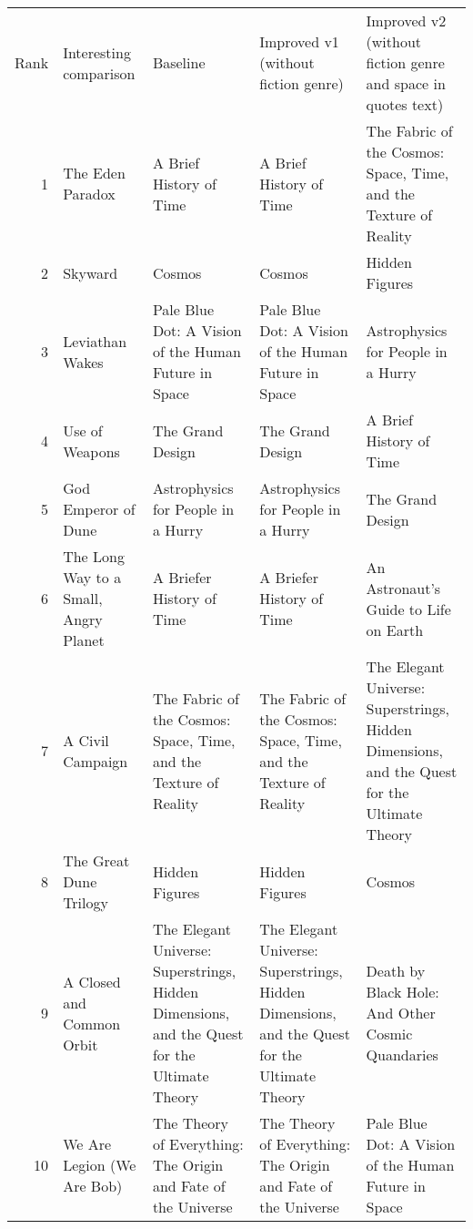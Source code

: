 \begin{tabular}{rllll}
Rank & Interesting comparison & Baseline & Improved v1 (without fiction genre) & Improved v2 (without fiction genre and space in quotes text) \\
1 & The Eden Paradox & A Brief History of Time & A Brief History of Time & The Fabric of the Cosmos: Space, Time, and the Texture of Reality \\
2 & Skyward & Cosmos & Cosmos & Hidden Figures \\
3 & Leviathan Wakes & Pale Blue Dot: A Vision of the Human Future in Space & Pale Blue Dot: A Vision of the Human Future in Space & Astrophysics for People in a Hurry \\
4 & Use of Weapons & The Grand Design & The Grand Design & A Brief History of Time \\
5 & God Emperor of Dune & Astrophysics for People in a Hurry & Astrophysics for People in a Hurry & The Grand Design \\
6 & The Long Way to a Small, Angry Planet & A Briefer History of Time & A Briefer History of Time & An Astronaut's Guide to Life on Earth \\
7 & A Civil Campaign & The Fabric of the Cosmos: Space, Time, and the Texture of Reality & The Fabric of the Cosmos: Space, Time, and the Texture of Reality & The Elegant Universe: Superstrings, Hidden Dimensions, and the Quest for the Ultimate Theory \\
8 & The Great Dune Trilogy & Hidden Figures & Hidden Figures & Cosmos \\
9 & A Closed and Common Orbit & The Elegant Universe: Superstrings, Hidden Dimensions, and the Quest for the Ultimate Theory & The Elegant Universe: Superstrings, Hidden Dimensions, and the Quest for the Ultimate Theory & Death by Black Hole: And Other Cosmic Quandaries \\
10 & We Are Legion (We Are Bob) & The Theory of Everything: The Origin and Fate of the Universe & The Theory of Everything: The Origin and Fate of the Universe & Pale Blue Dot: A Vision of the Human Future in Space \\
\end{tabular}

